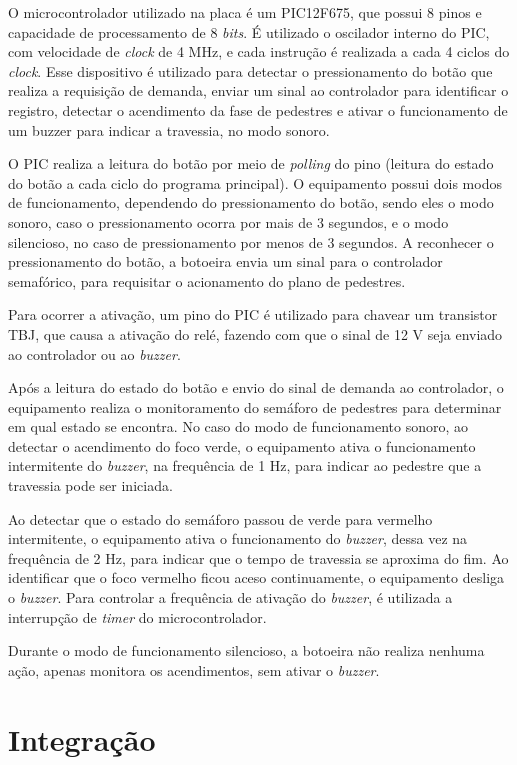 O microcontrolador utilizado na placa é um PIC12F675, que possui 8 pinos e capacidade de processamento de 8 \textit{bits}. É utilizado o oscilador interno do PIC, com velocidade de \textit{clock} de 4 MHz, e cada instrução é realizada a cada 4 ciclos do \textit{clock}. Esse dispositivo é utilizado para detectar o pressionamento do botão que realiza a requisição de demanda, enviar um sinal ao controlador para identificar o registro, detectar o acendimento da fase de pedestres e ativar o funcionamento de um buzzer para indicar a travessia, no modo sonoro. 

O PIC realiza a leitura do botão por meio de \textit{polling} do pino (leitura do estado do botão a cada ciclo do programa principal). O equipamento possui dois modos de funcionamento, dependendo do pressionamento do botão, sendo eles o modo sonoro, caso o pressionamento ocorra por mais de 3 segundos, e o modo silencioso, no caso de pressionamento por menos de 3 segundos. A reconhecer o pressionamento do botão, a botoeira envia um sinal para o controlador semafórico, para requisitar o acionamento do plano de pedestres. 

Para ocorrer a ativação, um pino do PIC é utilizado para chavear um transistor \ac{TBJ}, que causa a ativação do relé, fazendo com que o sinal de 12 V seja enviado ao controlador ou ao \textit{buzzer}. 

Após a leitura do estado do botão e envio do sinal de demanda ao controlador, o equipamento realiza o monitoramento do semáforo de pedestres para determinar em qual estado se encontra.
No caso do modo de funcionamento sonoro, ao detectar o acendimento do foco verde, o equipamento ativa o funcionamento intermitente do \textit{buzzer}, na frequência de 1 Hz, para indicar ao pedestre que a travessia pode ser iniciada.

Ao detectar que o estado do semáforo passou de verde para vermelho intermitente, o equipamento ativa o funcionamento do \textit{buzzer}, dessa vez na frequência de 2 Hz, para indicar que o tempo de travessia se aproxima do fim. Ao identificar que o foco vermelho ficou aceso continuamente, o equipamento desliga o \textit{buzzer}.
Para controlar a frequência de ativação do \textit{buzzer}, é utilizada a interrupção de \textit{timer} do microcontrolador.

Durante o modo de funcionamento silencioso, a botoeira não realiza nenhuma ação, apenas monitora os acendimentos, sem ativar o \textit{buzzer}.

\section{Integração}

